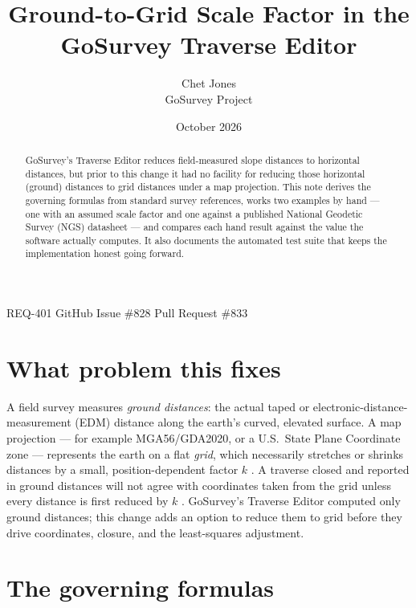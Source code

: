 \documentclass[11pt]{article}
\title{\textbf{Ground-to-Grid Scale Factor in the\\GoSurvey Traverse Editor}}
\author{Chet Jones \\ \small GoSurvey Project}
\date{October 2026}
\begin{document}
\maketitle
\vspace{-1.5em}
\begin{center}
\small REQ-401 \quad\textbar\quad GitHub Issue \#828 \quad\textbar\quad Pull Request \#833
\end{center}
\vspace{1em}

\begin{abstract}
\noindent GoSurvey's Traverse Editor reduces field-measured slope distances to
horizontal distances, but prior to this change it had no facility for
reducing those horizontal (ground) distances to grid distances under a map
projection. This note derives the governing formulas from standard survey
references, works two examples by hand --- one with an assumed scale
factor and one against a published National Geodetic Survey (NGS)
datasheet --- and compares each hand result against the value the software
actually computes. It also documents the automated test suite that keeps
the implementation honest going forward.
\end{abstract}

\section{What problem this fixes}

A field survey measures \emph{ground distances}: the actual taped or
electronic-distance-measurement (EDM) distance along the earth's curved,
elevated surface. A map projection --- for example MGA56/GDA2020, or a
U.S.\ State Plane Coordinate zone --- represents the earth on a flat
\emph{grid}, which necessarily stretches or shrinks distances by a small,
position-dependent factor $k$ \citep{snyder1987}. A traverse closed and
reported in ground distances will not agree with coordinates taken from the
grid unless every distance is first reduced by $k$ \citep{ghilaniwolf2015}.
GoSurvey's Traverse Editor computed only ground distances; this change adds
an option to reduce them to grid before they drive coordinates, closure,
and the least-squares adjustment.

\section{The governing formulas}
\end{document}
